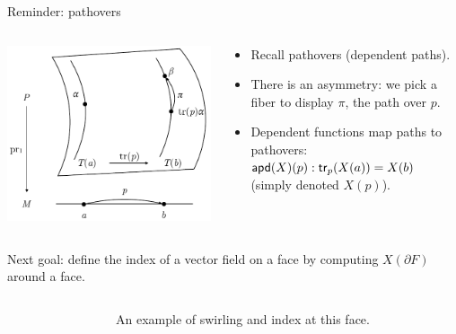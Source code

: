 \begin{frame}{Reminder: pathovers}
\begin{columns}
\begin{column}{0.35\textwidth}
\includegraphics[width=30ex]{figs/pathovers.pdf}
\end{column}
\begin{column}{0.65\textwidth}
\begin{itemize}
\item Recall pathovers (dependent paths).
\item There is an asymmetry: we pick a fiber to display \( \pi \), the path over \( p \).
\item Dependent functions map paths to pathovers: \( \mathsf{apd} (X)(p):\mathsf{tr}_p(X(a))=X(b) \) (simply denoted \( X(p) \)).
\end{itemize}
\end{column}
\end{columns}
\end{frame}

\begin{frame}
Next goal: define the index of a vector field on a face by computing \( X(\partial F) \) around a face.
\end{frame}

\begin{frame}
\begin{columns}
\begin{column}{0.65\textwidth}
\vspace{12pt}
\begingroup
{}

\endgroup
\end{column}
\begin{column}{0.35\textwidth}
An example of \alert{swirling} and \alert{index} at this face.
\end{column}
\end{columns}
\end{frame}

